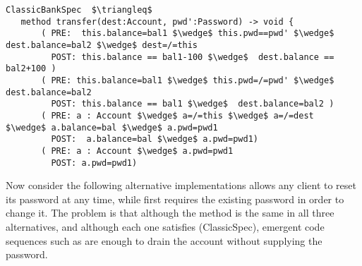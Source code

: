 \begin{lstlisting}[mathescape=true, frame=lines, language=Chainmail]
ClassicBankSpec  $\triangleq$
   method transfer(dest:Account, pwd':Password) -> void {
       ( PRE:  this.balance=bal1 $\wedge$ this.pwd==pwd' $\wedge$ dest.balance=bal2 $\wedge$ dest=/=this 
         POST: this.balance == bal1-100 $\wedge$  dest.balance == bal2+100 )
       ( PRE: this.balance=bal1 $\wedge$ this.pwd=/=pwd' $\wedge$ dest.balance=bal2
         POST: this.balance == bal1 $\wedge$  dest.balance=bal2 )
       ( PRE: a : Account $\wedge$ a=/=this $\wedge$ a=/=dest  $\wedge$ a.balance=bal $\wedge$ a.pwd=pwd1
         POST:  a.balance=bal $\wedge$ a.pwd=pwd1)
       ( PRE: a : Account $\wedge$ a.pwd=pwd1  
         POST: a.pwd=pwd1)       
\end{lstlisting}
 
 

Now consider the following alternative implementations
 allows any client to reset its password at any time, while
 first requires the existing password in order to change it.
The problem is that although the  method is the same in
all three alternatives, and although each one satisfies (ClassicSpec),
emergent code sequences such as
%
%
are enough to drain the account  without supplying the password.


  
%
  
